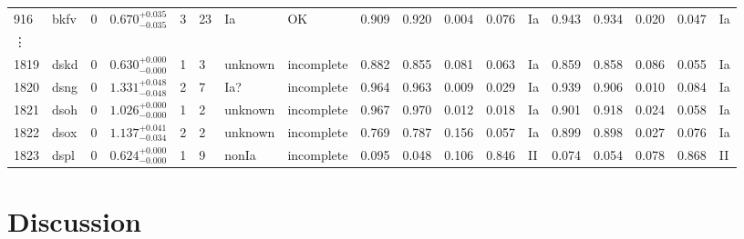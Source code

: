 \documentclass[useamsfonts]{pasj01}
\begin{document}
\begin{table}[ht]
{\begin{tabular}{p{1.5em}p{1em}p{1em}p{4.0em}p{1.5em}p{0.6em}p{3.0em}p{4.5em}|p{2.9em}|p{1.3em}p{1.3em}p{1.3em}p{1em}|p{2.9em}|p{1.3em}p{1.3em}p{1.3em}p{1em}}
916  &  bkfv &     0 &    $0.670_{-0.035}^{+0.035}$ &         3 &   23 &     Ia &     OK &    0.909 &    0.920 &    0.004 &    0.076 &      Ia &    0.943 &    0.934 &    0.020 &    0.047 &      Ia \\
\vdots & & & & & & & & & & & & & & & & &\\
1819 &  dskd &     0 &    $0.630_{-0.000}^{+0.000}$ &         1 &    3 &  unknown &   incomplete &    0.882 &    0.855 &    0.081 &    0.063 &      Ia &    0.859 &    0.858 &    0.086 &    0.055 &      Ia \\
1820 &  dsng &     0 &    $1.331_{-0.048}^{+0.048}$ &         2 &    7 &    Ia? &   incomplete &    0.964 &    0.963 &    0.009 &    0.029 &      Ia &    0.939 &    0.906 &    0.010 &    0.084 &      Ia \\
1821 &  dsoh &     0 &    $1.026_{-0.000}^{+0.000}$ &         1 &    2 &  unknown &   incomplete &    0.967 &    0.970 &    0.012 &    0.018 &      Ia &    0.901 &    0.918 &    0.024 &    0.058 &      Ia \\
1822 &  dsox &     0 &    $1.137_{-0.034}^{+0.041}$ &         2 &    2 &  unknown &   incomplete &    0.769 &    0.787 &    0.156 &    0.057 &      Ia &    0.899 &    0.898 &    0.027 &    0.076 &      Ia \\
1823 &  dspl &     0 &    $0.624_{-0.000}^{+0.000}$ &         1 &    9 &  nonIa &   incomplete &    0.095 &    0.048 &    0.106 &    0.846 &      II &    0.074 &    0.054 &    0.078 &    0.868 &      II \\
\hline
\end{tabular}
}\label{tab:h_results}
\end{table}

\section{Discussion}
%
\end{document}
